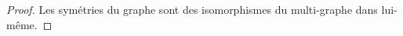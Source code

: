 \begin{proof}
Les symétries du graphe sont des isomorphismes du multi-graphe dans lui-même.
\end{proof}






